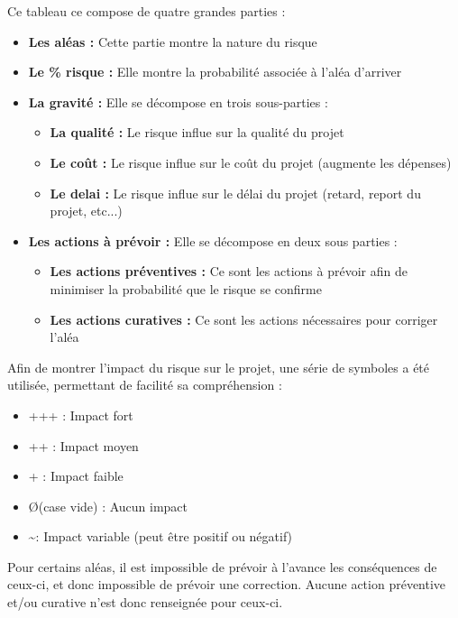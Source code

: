 \documentclass[french]{article}
\begin{document}
Ce tableau ce compose de quatre grandes parties :

\begin{itemize}
	\item \textbf{Les aléas :} Cette partie montre la nature du risque
	\item \textbf{Le \% risque :} Elle montre la probabilité associée à l'aléa d'arriver
	\item \textbf{La gravité :} Elle se décompose en trois sous-parties :
	\begin{itemize}
		\item \textbf{La qualité :} Le risque influe sur la qualité du projet
		\item \textbf{Le coût :} Le risque influe sur le coût du projet (augmente les dépenses)
		\item \textbf{Le delai :} Le risque influe sur le délai du projet (retard, report du projet, etc...)
	\end{itemize}
	\item \textbf{Les actions à prévoir :} Elle se décompose en deux sous parties :
	\begin{itemize}
		\item \textbf{Les actions préventives :} Ce sont les actions à prévoir afin de minimiser la probabilité que le risque se confirme
		\item \textbf{Les actions curatives :} Ce sont les actions nécessaires pour corriger l'aléa
	\end{itemize}
\end{itemize}

Afin de montrer l'impact du risque sur le projet, une série de symboles a été utilisée, permettant de facilité sa compréhension :

\begin{itemize}
	\item +++ : Impact fort
	\item ++ : Impact moyen
	\item + : Impact faible
	\item \O (case vide) : Aucun impact
	\item \textasciitilde : Impact variable (peut être positif ou négatif)
\end{itemize}

Pour certains aléas, il est impossible de prévoir à l'avance les conséquences de ceux-ci, et donc impossible de prévoir une correction. Aucune action préventive et/ou curative n'est donc renseignée pour ceux-ci.
\end{document}
